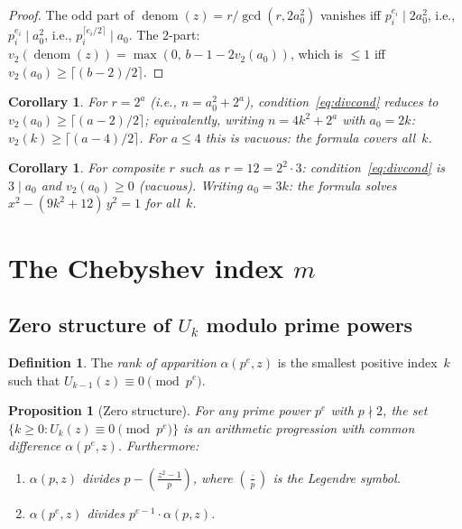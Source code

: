 \documentclass[11pt]{article}
\newtheorem{corollary}[theorem]{Corollary}
\newtheorem{proposition}[theorem]{Proposition}
\theoremstyle{definition}
\newtheorem{definition}[theorem]{Definition}
\theoremstyle{remark}
\begin{document}
\begin{proof}
The odd part of $\operatorname{denom}(z) = r/\gcd(r, 2a_0^2)$ vanishes
iff $p_i^{e_i} \mid 2a_0^2$, i.e., $p_i^{e_i} \mid a_0^2$, i.e.,
$p_i^{\lceil e_i/2\rceil} \mid a_0$.
The $2$-part: $v_2(\operatorname{denom}(z)) = \max(0,\, b - 1 - 2v_2(a_0))$,
which is $\le 1$ iff $v_2(a_0) \ge \lceil(b-2)/2\rceil$.
\end{proof}

\begin{corollary}\label{cor:r2a}
For $r = 2^a$ (i.e., $n = a_0^2 + 2^a$), condition~\eqref{eq:divcond}
reduces to $v_2(a_0) \ge \lceil(a-2)/2\rceil$; equivalently, writing
$n = 4k^2 + 2^a$ with $a_0 = 2k$: $v_2(k) \ge \lceil(a-4)/2\rceil$.
For $a \le 4$ this is vacuous: the formula covers all~$k$.
\end{corollary}

\begin{corollary}\label{cor:composite}
For composite $r$ such as $r = 12 = 2^2 \cdot 3$:
condition~\eqref{eq:divcond} is $3 \mid a_0$ and $v_2(a_0) \ge 0$
(vacuous).  Writing $a_0 = 3k$: the formula solves
$x^2 - (9k^2+12)\,y^2 = 1$ for \emph{all}~$k$.
\end{corollary}

\section{The Chebyshev index $m$}\label{sec:index}

\subsection{Zero structure of $U_k$ modulo prime powers}

\begin{definition}
The \emph{rank of apparition} $\alpha(p^e, z)$ is the smallest positive
index~$k$ such that $U_{k-1}(z) \equiv 0 \pmod{p^e}$.
\end{definition}

\begin{proposition}[Zero structure]\label{prop:zeros}
For any prime power $p^e$ with $p \nmid 2$, the set
$\{k \ge 0 : U_k(z) \equiv 0 \pmod{p^e}\}$
is an arithmetic progression with common difference $\alpha(p^e, z)$.
Furthermore:
\begin{enumerate}
\item[(i)] $\alpha(p, z)$ divides $p - \left(\frac{z^2 - 1}{p}\right)$,
  where $\left(\frac{\cdot}{p}\right)$ is the Legendre symbol.
\item[(ii)] $\alpha(p^e, z)$ divides $p^{e-1} \cdot \alpha(p, z)$.
\end{enumerate}
\end{proposition}
\end{document}

